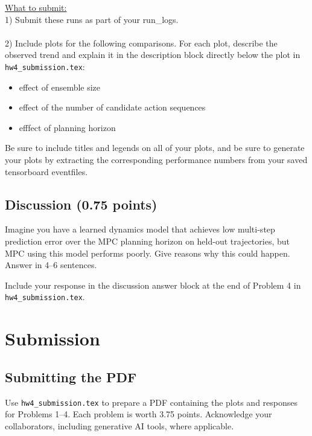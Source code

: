 \documentclass{article} %
\begin{document}
\underline{What to submit:}\\
1) Submit these runs as part of your run\_logs.\\ \\
2) Include plots for the following comparisons. For each plot, describe the observed trend and explain it in the description block directly below the plot in \texttt{hw4\_submission.tex}:\\
\begin{itemize}
    \item effect of ensemble size
    \item effect of the number of candidate action sequences
    \item efffect of planning horizon
\end{itemize}

Be sure to include titles and legends on all of your plots, and be sure to generate your plots by extracting the corresponding performance numbers from your saved tensorboard eventfiles.


\newpage
\subsection*{Discussion (0.75 points)}

Imagine you have a learned dynamics model that achieves low multi-step prediction error over the MPC planning horizon on held-out trajectories, but MPC using this model performs poorly. Give reasons why this could happen. Answer in 4--6 sentences.

Include your response in the discussion answer block at the end of Problem 4 in \texttt{hw4\_submission.tex}.

\newpage
\section*{Submission}

\subsection{Submitting the PDF}
Use \texttt{hw4\_submission.tex} to prepare a PDF containing the plots and responses for Problems 1--4. Each problem is worth 3.75 points. Acknowledge your collaborators, including generative AI tools, where applicable.
\end{document}
